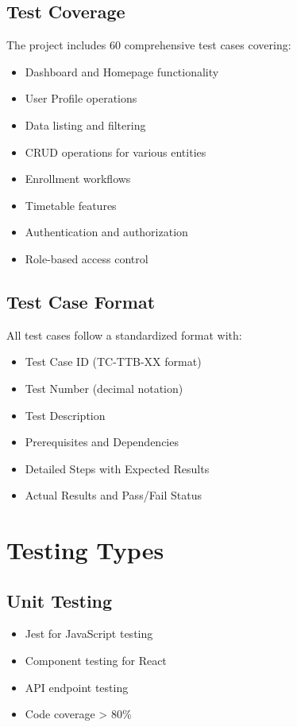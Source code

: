 \documentclass[12pt,a4paper]{report}
\begin{document}
\subsection{Test Coverage}
The project includes 60 comprehensive test cases covering:
\begin{itemize}[leftmargin=*]
    \item Dashboard and Homepage functionality
    \item User Profile operations
    \item Data listing and filtering
    \item CRUD operations for various entities
    \item Enrollment workflows
    \item Timetable features
    \item Authentication and authorization
    \item Role-based access control
\end{itemize}

\subsection{Test Case Format}
All test cases follow a standardized format with:
\begin{itemize}[leftmargin=*]
    \item Test Case ID (TC-TTB-XX format)
    \item Test Number (decimal notation)
    \item Test Description
    \item Prerequisites and Dependencies
    \item Detailed Steps with Expected Results
    \item Actual Results and Pass/Fail Status
\end{itemize}

\section{Testing Types}

\subsection{Unit Testing}
\begin{itemize}[leftmargin=*]
    \item Jest for JavaScript testing
    \item Component testing for React
    \item API endpoint testing
    \item Code coverage > 80\%
\end{itemize}
\end{document}
